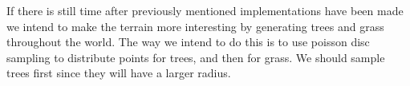 If there is still time after previously mentioned implementations have been made we intend to make the terrain more interesting by generating trees and grass throughout the world.
The way we intend to do this is to use poisson disc sampling to distribute points for trees, and then for grass. %
We should sample trees first since they will have a larger radius.

 

  
